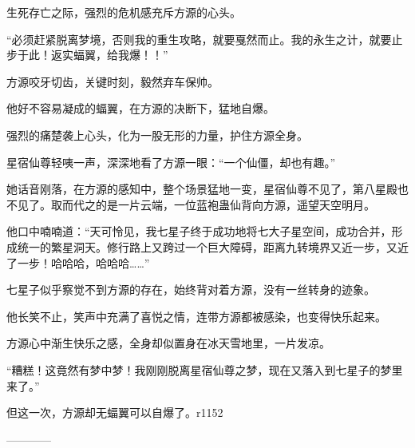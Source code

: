 \begin{this_body}
生死存亡之际，强烈的危机感充斥方源的心头。

“必须赶紧脱离梦境，否则我的重生攻略，就要戛然而止。我的永生之计，就要止步于此！返实蝠翼，给我爆！！”

方源咬牙切齿，关键时刻，毅然弃车保帅。

他好不容易凝成的蝠翼，在方源的决断下，猛地自爆。

强烈的痛楚袭上心头，化为一股无形的力量，护住方源全身。

星宿仙尊轻咦一声，深深地看了方源一眼：“一个仙僵，却也有趣。”

她话音刚落，在方源的感知中，整个场景猛地一变，星宿仙尊不见了，第八星殿也不见了。取而代之的是一片云端，一位蓝袍蛊仙背向方源，遥望天空明月。

他口中喃喃道：“天可怜见，我七星子终于成功地将七大子星空间，成功合并，形成统一的繁星洞天。修行路上又跨过一个巨大障碍，距离九转境界又近一步，又近了一步！哈哈哈，哈哈哈……”

七星子似乎察觉不到方源的存在，始终背对着方源，没有一丝转身的迹象。

他长笑不止，笑声中充满了喜悦之情，连带方源都被感染，也变得快乐起来。

方源心中渐生快乐之感，全身却似置身在冰天雪地里，一片发凉。

“糟糕！这竟然有梦中梦！我刚刚脱离星宿仙尊之梦，现在又落入到七星子的梦里来了。”

但这一次，方源却无蝠翼可以自爆了。r1152

------------

\end{this_body}

